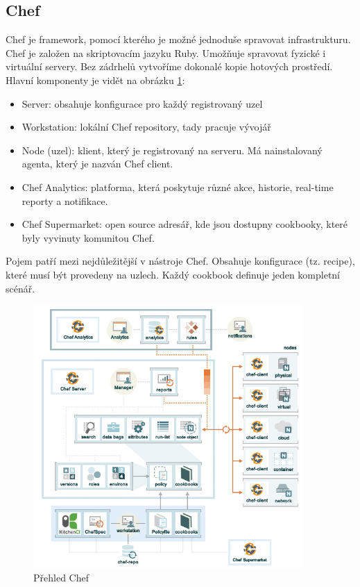 \subsection{Chef}
Chef je framework, pomocí kterého je možné jednoduše spravovat infrastrukturu. Chef je založen na skriptovacím jazyku Ruby. Umožňuje spravovat fyzické i virtuální servery. Bez zádrhelů vytvoříme dokonalé kopie hotových prostředí. Hlavní komponenty je vidět na obrázku \ref{fig:chefoverview}:

\begin{itemize}
\item Server: obsahuje konfigurace pro každý registrovaný uzel
\item Workstation: lokální Chef repository, tady pracuje vývojář
\item Node (uzel): klient, který je registrovaný na serveru. Má nainstalovaný agenta, který je nazván Chef client.
\item Chef Analytics: platforma, která poskytuje různé akce, historie, real-time reporty a notifikace.
\item Chef Supermarket: open source adresář, kde jsou dostupny cookbooky, které byly vyvinuty komunitou Chef.
\end{itemize}

Pojem  patří mezi nejdůležitější v nástroje Chef. Obsahuje konfigurace (tz. recipe), které musí být provedeny na uzlech. Každý cookbook definuje jeden kompletní scénář. \cite{ChefHandsOnLab}

\begin{figure}[]
  \centering
  \includegraphics[height=10cm]{fig/chef_overview.png}
  \caption{Přehled Chef}
  \label{fig:chefoverview}
\end{figure}

